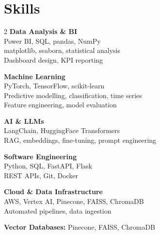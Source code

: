 \documentclass[10pt,a4paper]{article}
\begin{document}
\section{Skills}

\begin{multicols}{2}
\textbf{Data Analysis \& BI}\\
Power BI, SQL, pandas, NumPy\\
matplotlib, seaborn, statistical analysis\\
Dashboard design, KPI reporting

\medskip
\textbf{Machine Learning}\\
PyTorch, TensorFlow, scikit-learn\\
Predictive modelling, classification, time series\\
Feature engineering, model evaluation

\medskip
\textbf{AI \& LLMs}\\
LangChain, HuggingFace Transformers\\
RAG, embeddings, fine-tuning, prompt engineering

\columnbreak

\textbf{Software Engineering}\\
Python, SQL, FastAPI, Flask\\
REST APIs, Git, Docker

\medskip
\textbf{Cloud \& Data Infrastructure}\\
AWS, Vertex AI, Pinecone, FAISS, ChromaDB\\
Automated pipelines, data ingestion

\medskip
\textbf{Vector Databases:} Pinecone, FAISS, ChromaDB
\end{multicols}
\end{document}
